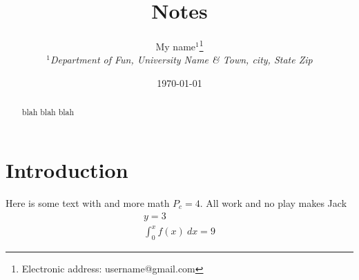 \documentclass[pdftex]{article}
\begin{document}
\title{Notes}

\author{My name$^{1}$\footnote{Electronic address: username@gmail.com}\\

{\it $^{1}$Department of Fun, University Name \& Town, city, State Zip}}

\date{\today}

\begin{abstract}
blah blah blah
\end{abstract}

\maketitle %

\tableofcontents

\newpage

\section{Introduction}

Here is some text with\cite{name1,*name2} and more math $P_c=4$. All work and no play makes Jack
\begin{equation}
\begin{gathered}
y=3 \\
\int_0^x f(x)\ dx=9
\end{gathered}
\label{eq:name_of_eq}
\end{equation}

\end{document}
